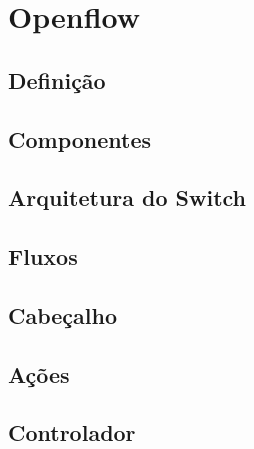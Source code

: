 \section{Openflow}



\subsection{Definição}

\subsection{Componentes}

\subsection{Arquitetura do Switch}

\subsection{Fluxos}

\subsection{Cabeçalho}

\subsection{Ações}

\subsection{Controlador}
